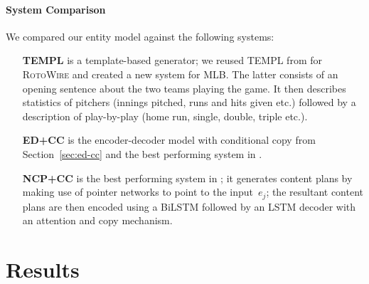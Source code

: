 \documentclass[11pt,a4paper]{article}
\begin{document}
\paragraph{System Comparison}
We compared our entity model against the following systems:

\begin{itemize}

\item[\textbf{TEMPL}] is a template-based generator; we reused TEMPL
  from \citet{D17-1239} for \textsc{RotoWire} and created
  a new system for MLB. The latter consists of an opening sentence
  about the two teams playing the game. It then describes statistics
  of pitchers (innings pitched, runs and hits given etc.)  followed by
  a description of play-by-play (home run, single, double, triple
  etc.). 

\item[\textbf{ED+CC}] is the encoder-decoder model with conditional
  copy from Section~\ref{sec:ed-cc} and the best performing
  system in \citet{D17-1239}.

\item[\textbf{NCP+CC}] is the best performing system in
  \citet{DBLP:journals/corr/abs-1809-00582}; it generates content
  plans by making use of pointer networks \cite{NIPS2015_5866} to
  point to the input~$e_j$; the resultant content plans are then
  encoded using a BiLSTM followed by an LSTM decoder with an attention
  and copy mechanism.

\end{itemize} 

\section{Results}
\label{sec:results}
\end{document}

